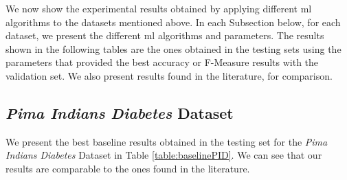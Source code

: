 We now show the experimental results obtained by applying different \ac{ml} algorithms to the datasets mentioned above. In each Subsection below, for each dataset, we present the different \ac{ml} algorithms and parameters. The results shown in the following tables are the ones obtained in the testing sets using the parameters that provided the best accuracy or F-Measure results with the validation set. We also present results found in the literature, for comparison.

\subsection{\emph{Pima Indians Diabetes} Dataset}

We present the best baseline results obtained in the testing set for the \emph{Pima Indians Diabetes} Dataset in Table \ref{table:baselinePID}. We can see that our results are comparable to the ones found in the literature.

